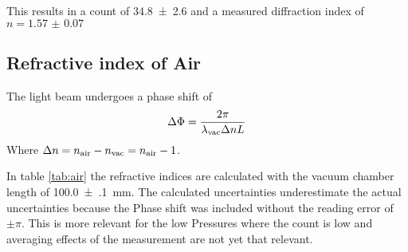 This results in a count of \num{34.8(26)} and a measured diffraction index of
$n = \num{1.57(7)}$

\subsection{Refractive index of Air}
The light beam undergoes a phase shift of
\begin{align}
	\Delta\Phi = \frac{2 \pi}{\lambda_\text{vac} \Delta n L }
\end{align}
Where $\Delta n = n_\text{air}- n_\text{vac} = n_\text{air}-1 $.

In table \ref{tab:air} the refractive indices are calculated with the vacuum chamber 
length of \qty{100.0(1)}{\mm}.
The calculated uncertainties underestimate the actual uncertainties because the Phase shift
was included without the reading error of $\pm \pi$. This is more relevant for the low
Pressures where the count is low and averaging effects of the measurement are not yet that relevant.

